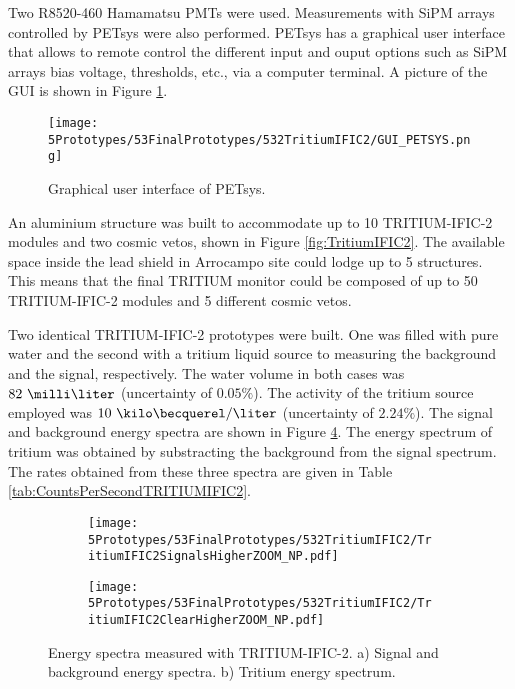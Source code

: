 Two R8520-460 Hamamatsu PMTs \cite{DataSheetPMTs} were used. Measurements with SiPM arrays controlled by PETsys were also performed. PETsys has a graphical user interface that allows to remote control the different input and ouput options such as SiPM arrays bias voltage, thresholds, etc., via a computer terminal. A picture of the GUI is shown in Figure \ref{fig:GUI_PETSYS}.
\begin{figure}[h]
\centering
\texttt{[image: 5Prototypes/53FinalPrototypes/532TritiumIFIC2/GUI\_PETSYS.png]}
\caption{Graphical user interface of PETsys.\label{fig:GUI_PETSYS}}
\end{figure} 

An aluminium structure was built to accommodate up to 10 TRITIUM-IFIC-2 modules and two cosmic vetos, shown in Figure \ref{fig:TritiumIFIC2}. The available space inside the lead shield in Arrocampo site could lodge up to 5 structures. This means that the final TRITIUM monitor could be composed of up to 50 TRITIUM-IFIC-2 modules and 5 different cosmic vetos.

Two identical TRITIUM-IFIC-2 prototypes were built. One was filled with pure water and the second with a tritium liquid source to measuring the background and the signal, respectively. The water volume in both cases was $82~\milli\liter$ (uncertainty of $0.05\%$). The activity of the tritium source employed was $10~\kilo\becquerel/\liter$ (uncertainty of $2.24\%$). The signal and background energy spectra are shown in Figure \ref{fig:EnergySpectraTRITIUMIFIC2}. The energy spectrum of tritium was obtained by substracting the background from the signal spectrum. The rates obtained from these three spectra are given in Table \ref{tab:CountsPerSecondTRITIUMIFIC2}. 

\begin{figure}
\centering
    \begin{subfigure}[b]{0.9\textwidth}
    \centering
    \texttt{[image: 5Prototypes/53FinalPrototypes/532TritiumIFIC2/TritiumIFIC2SignalsHigherZOOM\_NP.pdf]}  
    \caption{\label{subfig:SignalBackgroundEnergySpectraTritiumIFIC2}}
    \end{subfigure}
    \hfill
    \begin{subfigure}[b]{0.9\textwidth}
    \centering
    \texttt{[image: 5Prototypes/53FinalPrototypes/532TritiumIFIC2/TritiumIFIC2ClearHigherZOOM\_NP.pdf]}  
    \caption{\label{subfig:TritiumEnergySpectraTritiumIFIC2}}
    \end{subfigure}
 \caption{Energy spectra measured with TRITIUM-IFIC-2. a) Signal and background energy spectra. b) Tritium energy spectrum.}
 \label{fig:EnergySpectraTRITIUMIFIC2}
\end{figure}

